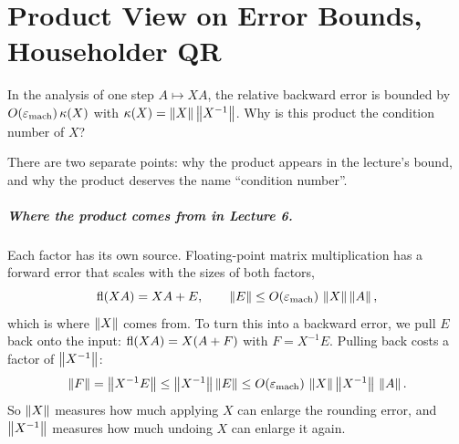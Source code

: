 \chapter{Product View on Error Bounds, Householder QR}

\begin{question}[Why is $\kappa(X) = \norm{X}\norm{X^{-1}}$?]
  \label{q:kappa}
  In the analysis of one step $A \mapsto XA$, the relative backward error is bounded by $O(\varepsilon_{\mathrm{mach}})\,\kappa(X)$ with $\kappa(X) = \norm{X}\norm{X^{-1}}$. Why is this product the condition number of $X$?
\end{question}

\begin{answer}
  There are two separate points: why the product appears in the lecture's bound, and why the product deserves the name ``condition number''.

  \paragraph{Where the product comes from in Lecture 6.} Each factor has its own source. Floating-point matrix multiplication has a forward error that scales with the sizes of both factors,
  \begin{equation}
    \operatorname{fl}(XA) = XA + E, \qquad \left\lVert E \right\rVert \le O(\varepsilon_{\mathrm{mach}})\,\left\lVert X \right\rVert\left\lVert A \right\rVert,
  \end{equation}
  which is where $\left\lVert X \right\rVert$ comes from. To turn this into a backward error, we pull $E$ back onto the input: $\operatorname{fl}(XA) = X(A + F)$ with $F = X^{-1}E$. Pulling back costs a factor of $\left\lVert X^{-1} \right\rVert$:
  \begin{equation}
    \left\lVert F \right\rVert = \left\lVert X^{-1}E \right\rVert \le \left\lVert X^{-1} \right\rVert\left\lVert E \right\rVert \le O(\varepsilon_{\mathrm{mach}})\,\left\lVert X \right\rVert\left\lVert X^{-1} \right\rVert\,\left\lVert A \right\rVert.
  \end{equation}
  So $\left\lVert X \right\rVert$ measures how much applying $X$ can enlarge the rounding error, and $\left\lVert X^{-1} \right\rVert$ measures how much undoing $X$ can enlarge it again.


\end{answer}
